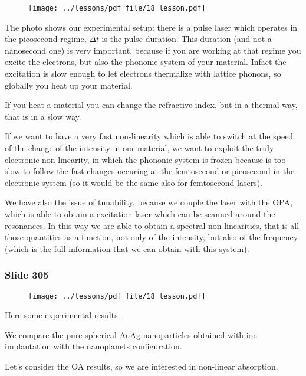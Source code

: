 \documentclass[../main/main.tex]{subfiles}
\begin{document}
\begin{figure}[h!]
\centering
\texttt{[image: ../lessons/pdf\_file/18\_lesson.pdf]}
\end{figure}

The photo shows our experimental setup: there is a  pulse laser which operates in the picosecond regime, $\Delta t$ is the pulse duration. This duration (and not a nanosecond one) is very important,  because if you are working at that regime you excite the electrons, but also the phononic system of your material. Infact the excitation is slow enough to let electrons thermalize with lattice phonons, so globally you heat up your material. 

If you heat a material you can change the refractive index, but in a thermal way, that is in a slow way.

If we want to have a very fast non-linearity which is able to switch at the speed of the change of the intensity in our material, we want to exploit the truly electronic non-linearity, in which the phononic system is frozen because is too slow to follow the fast changes occuring at the femtosecond or picosecond in the electronic system (so it would be the same also for femtosecond lasers).

We have also the issue of tunability, because we couple the laser with the OPA, which is able to obtain a excitation laser which can be scanned around the resonances. In this way we are able to obtain a spectral non-linearities, that is all those quantities as a function, not only of the intensity, but also of the frequency (which is the full information that we can obtain with this system).

\newpage

\subsubsection{Slide 305}

\begin{figure}[h!]
\centering
\texttt{[image: ../lessons/pdf\_file/18\_lesson.pdf]}
\end{figure}

Here some experimental results. 

We compare the pure spherical AuAg nanoparticles obtained with ion implantation with the nanoplanets configuration.

Let’s consider the OA results, so we are interested in non-linear absorption. 
\end{document}
